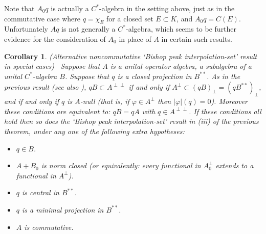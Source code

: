 \documentclass{amsart}
\newtheorem{corollary}[theorem]{Corollary}
\theoremstyle{remark}
\theoremstyle{definition}
\numberwithin{equation}{section}
\begin{document}
 Note that $A_0 q$ is actually a $C^*$-algebra in the setting above, just as in the commutative case where $q = \chi_E$ for a closed set $E \subset K$, and $A_0 q = C(E)$.  
 Unfortunately $A q$ is not generally a $C^*$-algebra, which seems to be further evidence for the consideration of $A_0$ in place of $A$ in certain such results.
 
\begin{corollary} \label{peakthstr}  {\rm (Alternative noncommutative `Bishop peak interpolation-set' result in 
special cases)} \  Suppose that $A$ is a unital operator algebra, 
a subalgebra of a unital $C^*$-algebra $B$.
Suppose that  $q$ is a closed projection in $B^{**}$. 
As in the previous result (see also {\rm \cite[Theorem 6.2]{CT}}), $q B \subset A^{\perp \perp}$
if and only if $A^{\perp} \subset (q B)_\perp 
= (q B^{**})_\perp$, and if and only if 
$q$ is $A$-null (that is,  if  $\varphi \in A^{\perp}$ then $|\varphi|(q) = 0$).  Moreover these conditions are equivalent to: 
 $qB = qA$ with $q \in A^{\perp \perp}$.  
If these conditions all  hold then so does  the `Bishop peak interpolation-set' result  in {\rm (iii)} 
of the previous theorem, 
under any one of the following extra hypotheses: 
\begin{itemize} \item [(1)] 
 $q \in B$.
 \item [(2)] $A + B_0$ is norm closed (or equivalently: every functional in $A_0^\perp$ extends to 
 a functional in $A^\perp$). 
 \item [(3)]  $q$ is central in $B^{**}$. 
 \item [(4)]   $q$ is  a minimal projection in $B^{**}$.
  \item [(5)]  $A$ is commutative.
  \end{itemize} 
\end{corollary}
\end{document}
